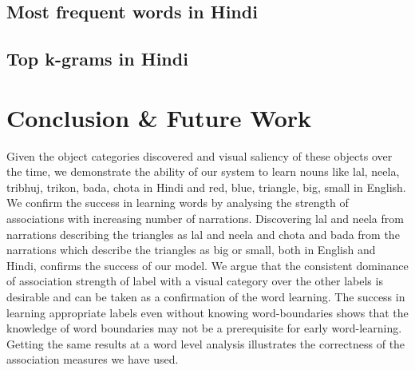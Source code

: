 \documentclass[compsoc]{IEEEtran}
\begin{document}
\subsection{Most frequent words in Hindi}

\subsection{Top k-grams in Hindi}


\section{Conclusion \& Future Work}
Given the object categories discovered and visual saliency of these objects over the time, we demonstrate the ability of our system to learn nouns like lal, neela, tribhuj, trikon, bada, chota in Hindi and red, blue, triangle, big, small in English. We confirm the success in learning words by analysing the strength of associations with increasing number of narrations. Discovering lal and neela from narrations describing the triangles as lal and neela and chota and bada from the narrations which describe the triangles as big or small, both in English and Hindi, confirms the success of our model. We argue that the consistent dominance of association strength of label with a visual category over the other labels is desirable and can be taken as a confirmation of the word learning. The success in learning appropriate labels even without knowing word-boundaries shows that the knowledge of word boundaries may not be a prerequisite for early word-learning. Getting the same results at a word level analysis illustrates the correctness of the association measures we have used.

\end{document}
